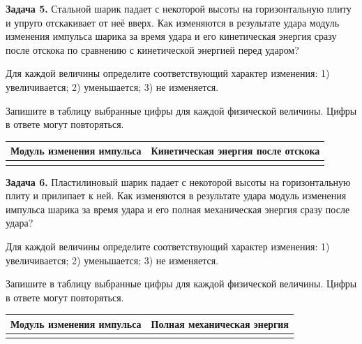 \begin{taskbasic}[code={\label{task:momentum_v19_n6}}]
\textbf{Задача 5.} Стальной шарик падает с некоторой высоты на горизонтальную плиту и упруго отскакивает от неё вверх. Как изменяются в результате удара модуль изменения импульса шарика за время удара и его кинетическая энергия сразу после отскока по сравнению с кинетической энергией перед ударом?

Для каждой величины определите соответствующий характер изменения:
1) увеличивается;
2) уменьшается;
3) не изменяется.

Запишите в таблицу выбранные цифры для каждой физической величины. Цифры в ответе могут повторяться.
\begin{center}
\begin{tabular}{|c|c|}
\hline
Модуль изменения импульса & Кинетическая энергия после отскока \\ \hline
 & \\ \hline
\end{tabular}
\end{center}

\end{taskbasic}

\begin{taskbasic}[code={\label{task:momentum_v20_n6}}]
\textbf{Задача 6.} Пластилиновый шарик падает с некоторой высоты на горизонтальную плиту и прилипает к ней. Как изменяются в результате удара модуль изменения импульса шарика за время удара и его полная механическая энергия сразу после удара?

Для каждой величины определите соответствующий характер изменения:
1) увеличивается;
2) уменьшается;
3) не изменяется.

Запишите в таблицу выбранные цифры для каждой физической величины. Цифры в ответе могут повторяться.
\begin{center}
\begin{tabular}{|c|c|}
\hline
Модуль изменения импульса & Полная механическая энергия \\ \hline
 & \\ \hline
\end{tabular}
\end{center}

\end{taskbasic}


